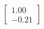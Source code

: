\documentclass[preview]{standalone}
\begin{document}
\begin{align*}
\begin{bmatrix} 1.00 \\ -0.21 \end{bmatrix}
\end{align*}
\end{document}
